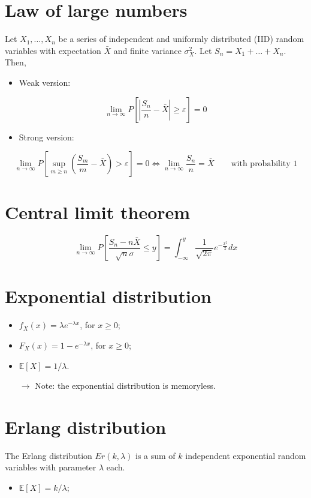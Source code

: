 \documentclass[12pt, openany]{report}
\newcommand{\E}{\mathbb{E}}
\theoremstyle{definition}
\begin{document}
\section{Law of large numbers}
Let $X_1,\dots,X_n$ be a series of independent and uniformly distributed (IID) random variables with expectation $\bar X$ and finite variance $\sigma_X^2$. Let $S_n = X_1+\dots +X_n$. Then, 
\begin{itemize}
  \item Weak version:
\end{itemize}
\begin{equation}
  \lim_{n\to \infty} P\left[|\frac{S_n}{n}-\bar X|\ge \varepsilon\right] = 0
\end{equation}
\begin{itemize}
  \item Strong version:
\end{itemize}
\begin{equation}
  \lim_{n\to \infty} P\left[\sup_{m\ge n}\left(\frac{S_m}{m}-\bar X\right)>\varepsilon\right] = 0\Longleftrightarrow \lim_{n\to \infty}\frac{S_n}{n}=\bar X\qquad \text{with probability 1}
\end{equation}
\section{Central limit theorem}
\begin{equation}
  \lim_{n\to \infty} P\left[\frac{S_n-n\bar X}{\sqrt{n}\sigma}\le y\right] = \int_{-\infty}^y \frac{1}{\sqrt{2\pi}} e^{-\frac{x^2}{2}}dx
\end{equation}
\section{Exponential distribution}
\begin{itemize}
  \item $f_X(x)=\lambda e^{-\lambda x}$, for $x\ge 0$;
  \item $F_X(x)=1-e^{-\lambda x}$, for $x\ge 0$;
  \item $\E[X]=1/\lambda$.
  \item [$\rightarrow$] Note: the exponential distribution is memoryless.
\end{itemize}
\section{Erlang distribution}
The Erlang distribution $Er(k,\lambda)$ is a sum of $k$ independent exponential random variables with parameter $\lambda$ each.
\begin{itemize}
	\item $\E[X] = k/\lambda$;
\end{itemize}
\end{document}
